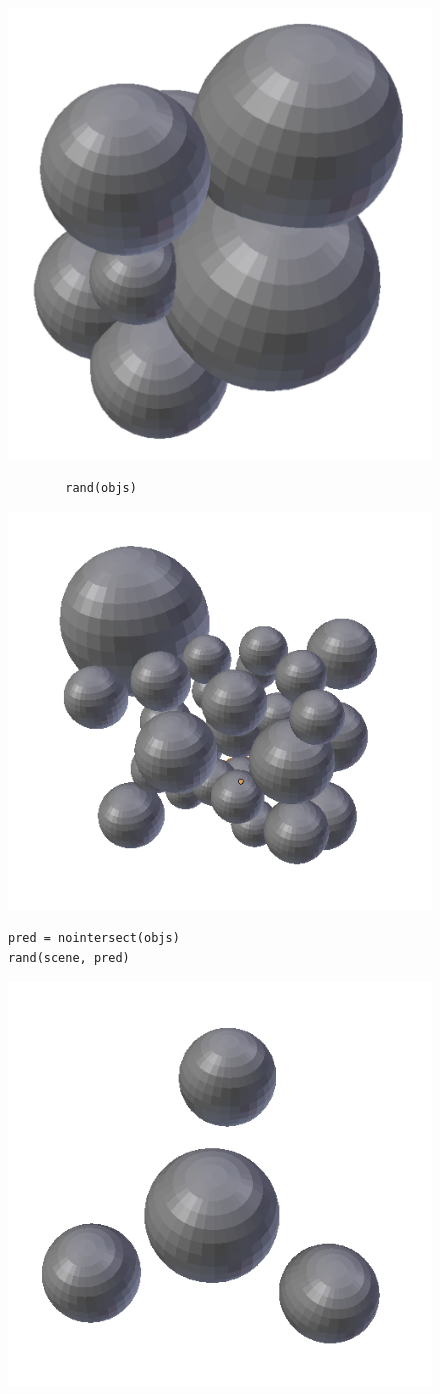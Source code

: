 \begin{figure}[H]
\centering
\begin{minipage}[t]{5cm}
\centering
\includegraphics[width=0.5\linewidth]{figures/clunk}
\begin{verbatim}
        rand(objs)
\end{verbatim}
\end{minipage}%
\begin{minipage}[t]{5cm}
\centering
\includegraphics[width=0.8\linewidth]{figures/render}
\begin{verbatim}
pred = nointersect(objs)
rand(scene, pred)
\end{verbatim}
\end{minipage}%
\begin{minipage}[t]{5cm}
\centering
\includegraphics[width=0.5\linewidth]{figures/equi}

\end{minipage}
\end{figure}
